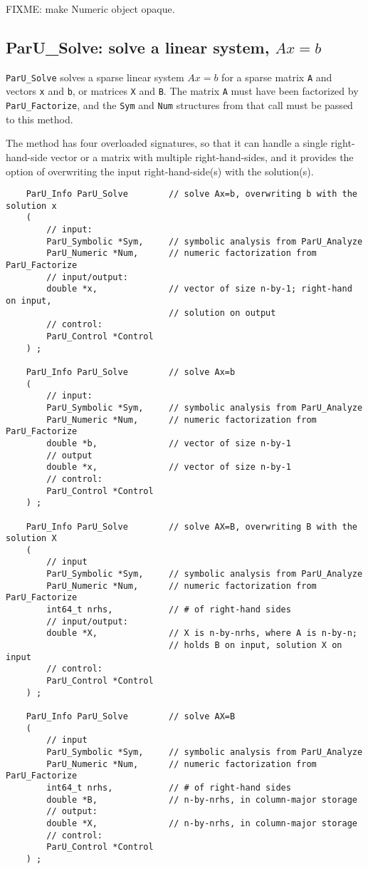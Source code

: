 \documentclass[12pt]{article}
\begin{document}
    FIXME: make Numeric object opaque.

\subsection{{\sf ParU\_Solve}: solve a linear system, $Ax=b$}

    \verb'ParU_Solve' solves a sparse linear system $Ax=b$ for a sparse
    matrix \verb'A' and vectors \verb'x' and \verb'b', or matrices
    \verb'X' and \verb'B'.  The matrix \verb'A' must have been factorized
    by \verb'ParU_Factorize', and the \verb'Sym' and \verb'Num' structures
    from that call must be passed to this method.

    The method has four overloaded signatures, so that it can handle a single
    right-hand-side vector or a matrix with multiple right-hand-sides, and it
    provides the option of overwriting the input right-hand-side(s) with the
    solution(s).

    {\footnotesize
    \begin{verbatim}
    ParU_Info ParU_Solve        // solve Ax=b, overwriting b with the solution x
    (
        // input:
        ParU_Symbolic *Sym,     // symbolic analysis from ParU_Analyze
        ParU_Numeric *Num,      // numeric factorization from ParU_Factorize
        // input/output:
        double *x,              // vector of size n-by-1; right-hand on input,
                                // solution on output
        // control:
        ParU_Control *Control
    ) ;

    ParU_Info ParU_Solve        // solve Ax=b
    (
        // input:
        ParU_Symbolic *Sym,     // symbolic analysis from ParU_Analyze
        ParU_Numeric *Num,      // numeric factorization from ParU_Factorize
        double *b,              // vector of size n-by-1
        // output
        double *x,              // vector of size n-by-1
        // control:
        ParU_Control *Control
    ) ;

    ParU_Info ParU_Solve        // solve AX=B, overwriting B with the solution X
    (
        // input
        ParU_Symbolic *Sym,     // symbolic analysis from ParU_Analyze
        ParU_Numeric *Num,      // numeric factorization from ParU_Factorize
        int64_t nrhs,           // # of right-hand sides
        // input/output:
        double *X,              // X is n-by-nrhs, where A is n-by-n;
                                // holds B on input, solution X on input
        // control:
        ParU_Control *Control
    ) ;

    ParU_Info ParU_Solve        // solve AX=B
    (
        // input
        ParU_Symbolic *Sym,     // symbolic analysis from ParU_Analyze
        ParU_Numeric *Num,      // numeric factorization from ParU_Factorize
        int64_t nrhs,           // # of right-hand sides
        double *B,              // n-by-nrhs, in column-major storage
        // output:
        double *X,              // n-by-nrhs, in column-major storage
        // control:
        ParU_Control *Control
    ) ; \end{verbatim} }
\end{document}

